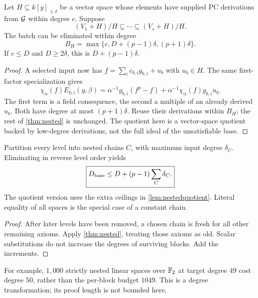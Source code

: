 \begin{lemma}\label{lem:nestedquotient}
Let $H\subseteq k[y]_{\le\delta}$ be a vector space whose elements have supplied PC derivations from $\mathcal G$ within degree $c$. Suppose
\[
 (V_1+H)/H\subseteq\cdots\subseteq(V_s+H)/H.
\]
The batch can be eliminated within degree
\[
 \boxed{B_H=\max\{c,D+(p-1)\delta,(p+1)\delta\}.}
\]
If $c\le D$ and $D\ge2\delta$, this is $D+(p-1)\delta$.
\end{lemma}
\begin{proof}
A selected input now has $f=\sum_i c_{b,i}g_{b,i}+u_b$ with $u_b\in H$. The same first-factor specialization gives
\[
 \chi_\alpha(f)E_{b,i}(y,\beta)
 =\alpha^{-1}g_{b,i}(f^p-f)
  +\alpha^{-1}\chi_\alpha(f)g_{b,i}u_b.
\]
The first term is a field consequence, the second a multiple of an already derived $u_b$. Both have degree at most $(p+1)\delta$. Reuse their derivations within $B_H$; the rest of \cref{thm:nested} is unchanged. The quotient here is a vector-space quotient backed by low-degree derivations, not the full ideal of the unsatisfiable base.
\end{proof}

\begin{corollary}\label{cor:chaincharge}
Partition every level into nested chains $C$, with maximum input degree $\delta_C$. Eliminating in reverse level order yields
\[
 \boxed{D_{\rm base}\le D+(p-1)\sum_C\delta_C.}
\]
The quotient version uses the extra ceilings in \cref{lem:nestedquotient}. Literal equality of all spaces is the special case of a constant chain.
\end{corollary}
\begin{proof}
After later levels have been removed, a chosen chain is fresh for all other remaining axioms. Apply \cref{thm:nested}, treating those axioms as old. Scalar substitutions do not increase the degrees of surviving blocks. Add the increments.
\end{proof}

For example, $1{,}000$ strictly nested linear spaces over $\mathbb F_2$ at target degree $49$ cost degree $50$, rather than the per-block budget $1049$. This is a degree transformation; its proof length is not bounded here.

